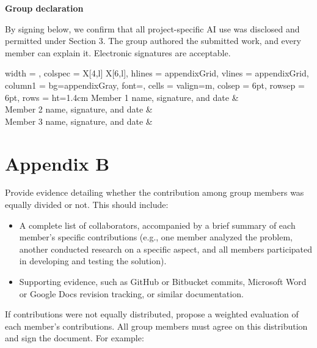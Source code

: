\noindent
\textbf{Group declaration}
\par\nopagebreak\smallskip

\noindent
By signing below, we confirm that all project-specific AI use
was disclosed and permitted under Section 3. The group authored
the submitted work, and every member can explain it. Electronic
signatures are acceptable.

\par\medskip

\noindent
\begin{tblr}{
		width = \linewidth,
		colspec = {X[4,l] X[6,l]},
		hlines = {appendixGrid},
		vlines = {appendixGrid},
		column{1} = {bg=appendixGray, font=\bfseries},
		cells = {valign=m},
		colsep = 6pt,
		rowsep = 6pt,
		rows = {ht=1.4cm}
	}
	Member 1 name, signature, and date
	&
	\\
	Member 2 name, signature, and date
	&
	\\
	Member 3 name, signature, and date
	&
	\\
\end{tblr}

\clearpage

\section*{Appendix B}
\label{app:B}

\noindent
Provide evidence detailing whether the contribution among
group members was equally divided or not. This should include:

\begin{itemize}
	\item A complete list of collaborators, accompanied by a
	brief summary of each member's specific contributions
	(e.g., one member analyzed the problem, another conducted
	research on a specific aspect, and all members participated
	in developing and testing the solution).
	
	\item Supporting evidence, such as GitHub or Bitbucket
	commits, Microsoft Word or Google Docs revision tracking,
	or similar documentation.
\end{itemize}

\noindent
If contributions were not equally distributed, propose a
weighted evaluation of each member's contributions. All group
members must agree on this distribution and sign the document.
For example:

\par\bigskip

